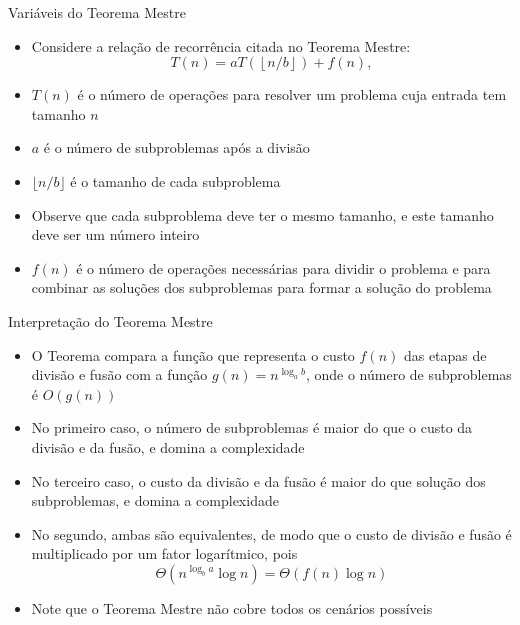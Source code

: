 \begin{frame}[fragile]{Variáveis do Teorema Mestre}

    \begin{itemize}
        \item Considere a relação de recorrência citada no Teorema Mestre:
        \[
            T(n) = aT\left(\left\lfloor n/b\right\rfloor\right) + f(n),
        \]

        \item $T(n)$ é o número de operações para resolver um problema cuja entrada tem tamanho $n$

        \item $a$ é o número de subproblemas após a divisão

        \item $\lfloor n/b\rfloor$ é o tamanho de cada subproblema

        \item Observe que cada subproblema deve ter o mesmo tamanho, e este tamanho deve ser
            um número inteiro

        \item $f(n)$ é o número de operações necessárias para dividir o problema e para 
            combinar as soluções dos subproblemas para formar a solução do problema
    \end{itemize}

\end{frame}

\begin{frame}[fragile]{Interpretação do Teorema Mestre}

    \begin{itemize}
        \item O Teorema compara a função que representa o custo $f(n)$ das etapas de divisão e
            fusão com a função $g(n) = n^{\log_a b}$, onde o número de subproblemas é $O(g(n))$

        \item No primeiro caso, o número de subproblemas é maior do que o custo da divisão e da
            fusão, e domina a complexidade

        \item No terceiro caso, o custo da divisão e da fusão é maior do que solução dos
            subproblemas, e domina a complexidade

        \item No segundo, ambas são equivalentes, de modo que o custo de divisão e fusão é
            multiplicado por um fator logarítmico, pois 
            \[
                \Theta(n^{\log_b a}\log n) = \Theta(f(n)\log n)
            \]

        \item Note que o Teorema Mestre não cobre todos os cenários possíveis
    \end{itemize}

\end{frame}
